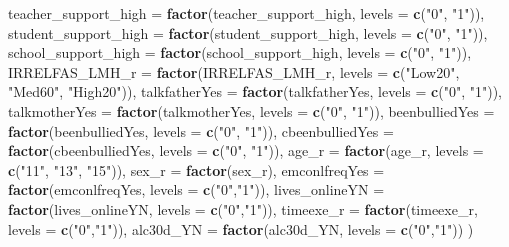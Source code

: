 \documentclass[
]{article}
\newenvironment{Shaded}{\begin{snugshade}}{\end{snugshade}}
\newcommand{\AttributeTok}[1]{\textcolor[rgb]{0.13,0.29,0.53}{#1}}
\newcommand{\FunctionTok}[1]{\textcolor[rgb]{0.13,0.29,0.53}{\textbf{#1}}}
\newcommand{\NormalTok}[1]{#1}
\newcommand{\StringTok}[1]{\textcolor[rgb]{0.31,0.60,0.02}{#1}}
\begin{document}
\begin{Shaded}
\begin{Highlighting}[]
         \AttributeTok{teacher\_support\_high =} \FunctionTok{factor}\NormalTok{(teacher\_support\_high, }\AttributeTok{levels =} \FunctionTok{c}\NormalTok{(}\StringTok{"0"}\NormalTok{, }\StringTok{"1"}\NormalTok{)),}
         \AttributeTok{student\_support\_high =} \FunctionTok{factor}\NormalTok{(student\_support\_high, }\AttributeTok{levels =} \FunctionTok{c}\NormalTok{(}\StringTok{"0"}\NormalTok{, }\StringTok{"1"}\NormalTok{)),}
         \AttributeTok{school\_support\_high =} \FunctionTok{factor}\NormalTok{(school\_support\_high, }\AttributeTok{levels =} \FunctionTok{c}\NormalTok{(}\StringTok{"0"}\NormalTok{, }\StringTok{"1"}\NormalTok{)),}
         \AttributeTok{IRRELFAS\_LMH\_r =} \FunctionTok{factor}\NormalTok{(IRRELFAS\_LMH\_r, }\AttributeTok{levels =} \FunctionTok{c}\NormalTok{(}\StringTok{"Low20"}\NormalTok{, }\StringTok{"Med60"}\NormalTok{, }\StringTok{"High20"}\NormalTok{)),}
         \AttributeTok{talkfatherYes =} \FunctionTok{factor}\NormalTok{(talkfatherYes, }\AttributeTok{levels =} \FunctionTok{c}\NormalTok{(}\StringTok{"0"}\NormalTok{, }\StringTok{"1"}\NormalTok{)),}
         \AttributeTok{talkmotherYes =} \FunctionTok{factor}\NormalTok{(talkmotherYes, }\AttributeTok{levels =} \FunctionTok{c}\NormalTok{(}\StringTok{"0"}\NormalTok{, }\StringTok{"1"}\NormalTok{)),}
         \AttributeTok{beenbulliedYes =} \FunctionTok{factor}\NormalTok{(beenbulliedYes, }\AttributeTok{levels =} \FunctionTok{c}\NormalTok{(}\StringTok{"0"}\NormalTok{, }\StringTok{"1"}\NormalTok{)),}
         \AttributeTok{cbeenbulliedYes =} \FunctionTok{factor}\NormalTok{(cbeenbulliedYes, }\AttributeTok{levels =} \FunctionTok{c}\NormalTok{(}\StringTok{"0"}\NormalTok{, }\StringTok{"1"}\NormalTok{)),}
         \AttributeTok{age\_r =} \FunctionTok{factor}\NormalTok{(age\_r, }\AttributeTok{levels =} \FunctionTok{c}\NormalTok{(}\StringTok{"11"}\NormalTok{, }\StringTok{"13"}\NormalTok{, }\StringTok{"15"}\NormalTok{)),}
         \AttributeTok{sex\_r =} \FunctionTok{factor}\NormalTok{(sex\_r),}
         \AttributeTok{emconlfreqYes =} \FunctionTok{factor}\NormalTok{(emconlfreqYes, }\AttributeTok{levels =} \FunctionTok{c}\NormalTok{(}\StringTok{"0"}\NormalTok{,}\StringTok{"1"}\NormalTok{)),       }
         \AttributeTok{lives\_onlineYN =} \FunctionTok{factor}\NormalTok{(lives\_onlineYN, }\AttributeTok{levels =} \FunctionTok{c}\NormalTok{(}\StringTok{"0"}\NormalTok{,}\StringTok{"1"}\NormalTok{)),    }
         \AttributeTok{timeexe\_r =} \FunctionTok{factor}\NormalTok{(timeexe\_r, }\AttributeTok{levels =} \FunctionTok{c}\NormalTok{(}\StringTok{"0"}\NormalTok{,}\StringTok{"1"}\NormalTok{)),    }
         \AttributeTok{alc30d\_YN =} \FunctionTok{factor}\NormalTok{(alc30d\_YN, }\AttributeTok{levels =} \FunctionTok{c}\NormalTok{(}\StringTok{"0"}\NormalTok{,}\StringTok{"1"}\NormalTok{))          }
\NormalTok{         )}
\end{Highlighting}
\end{Shaded}
\end{document}
